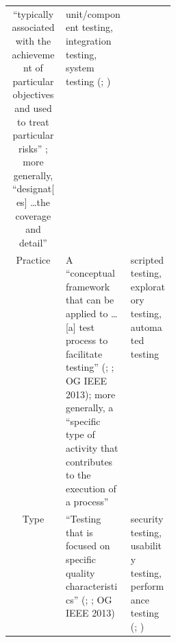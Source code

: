 \begin{table}[hbtp!]
\begin{tabularx}{\linewidth}{|c|X|m{0.275\linewidth}|}
        ``typically associated with the achievement of particular objectives
        and used to treat particular risks'' \citep[p.~12]{IEEE2022}; more
        generally, ``designat[es] \dots the coverage and detail''
        \citep[p.~249]{IEEE2017}          & unit/component testing,
        integration testing, system testing (\citealp[p.~12]{IEEE2022};
        \citealp[p.~467]{IEEE2017})                                                                    \\
        Practice                          & A ``conceptual framework
        that can be applied to \dots [a] test process to facilitate testing''
        (\citealp[p.~14]{IEEE2022}; \citealp[p.~471]{IEEE2017}; OG IEEE 2013);
        more generally, a ``specific type of activity
        that contributes to the execution of a process''
        \citep[p.~331]{IEEE2017}          & scripted testing,
        exploratory testing, automated testing \citep[p.~20]{IEEE2022}                                 \\
        Type                              & ``Testing that is focused
        on specific quality characteristics''
        (\citealp[p.~15]{IEEE2022}; \citealp[p.~473]{IEEE2017};
        OG IEEE 2013)                     & security testing, usability testing,
        performance testing (\citealp[p.~15]{IEEE2022};
        \citealp[p.~473]{IEEE2017})                                                                    \\
        \hline
    \end{tabularx}
\end{table}
